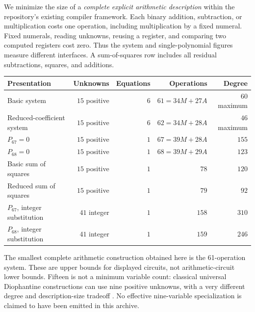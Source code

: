 \documentclass[11pt,a4paper]{article}
\theoremstyle{definition}
\theoremstyle{remark}
\newcommand{\Pbase}{P_{67}}
\newcommand{\Plow}{P_{68}}
\begin{document}
We minimize the size of a \emph{complete explicit arithmetic
description} within the repository's existing compiler framework.
Each binary addition, subtraction, or multiplication costs one operation,
including multiplication by a fixed numeral. Fixed numerals, reading
unknowns, reusing a register, and comparing two computed registers cost
zero. Thus the system and single-polynomial figures measure different
interfaces. A sum-of-squares row includes all residual subtractions,
squares, and additions.
\begin{center}\small
\begin{tabular}{lrrrr}
\toprule
Presentation & Unknowns & Equations & Operations & Degree\\
\midrule
Basic system & \(15\) positive & \(6\) & \(61=34M+27A\) & \(60\) maximum\\
Reduced-coefficient system & \(15\) positive & \(6\) & \(62=34M+28A\) & \(46\) maximum\\
\(\Pbase=0\) & \(15\) positive & \(1\) & \(67=39M+28A\) & \(155\)\\
\(\Plow=0\) & \(15\) positive & \(1\) & \(68=39M+29A\) & \(123\)\\
Basic sum of squares & \(15\) positive & \(1\) & \(78\) & \(120\)\\
Reduced sum of squares & \(15\) positive & \(1\) & \(79\) & \(92\)\\
\(\Pbase\), integer substitution & \(41\) integer & \(1\) & \(158\) & \(310\)\\
\(\Plow\), integer substitution & \(41\) integer & \(1\) & \(159\) & \(246\)\\
\bottomrule
\end{tabular}
\end{center}
The smallest complete arithmetic construction obtained here is the
61-operation system. These are upper bounds for displayed circuits,
not arithmetic-circuit lower bounds. Fifteen is not a minimum variable
count: classical universal Diophantine constructions can use nine
positive unknowns, with a very different degree and description-size
tradeoff \cite{jones}. No effective nine-variable specialization is
claimed to have been emitted in this archive.
\end{document}
